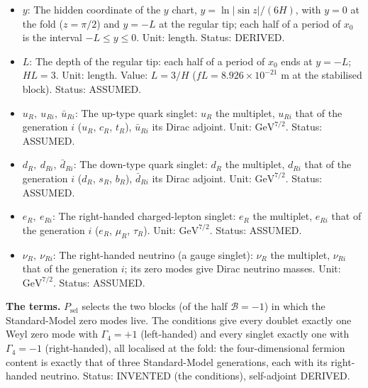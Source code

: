 \documentclass[
  10pt,
]{article}
\begin{document}
\begin{itemize}
  \(\psi \in \{Q, u_R, d_R, \ell, e_R, \nu_R\}\) of the generation
  \(i\), \(\psi_f\) one fermion component \(f\) (in four-dimensional
  formulas its zero mode); \(\bar\psi = \psi^\dagger C\) the Dirac
  adjoint. Unit: \(\mathrm{GeV}^{7/2}\) (eight dimensions),
  \(\mathrm{GeV}^{3/2}\) (four dimensions). Status: ASSUMED.
\item
  \(y\): The hidden coordinate of the \(y\) chart,
  \(y = \ln\lvert\sin z\rvert/(6H)\), with \(y = 0\) at the fold
  (\(z = \pi/2\)) and \(y = -L\) at the regular tip; each half of a
  period of \(x_0\) is the interval \(-L \le y \le 0\). Unit: length.
  Status: DERIVED.
\item
  \(L\): The depth of the regular tip: each half of a period of \(x_0\)
  ends at \(y = -L\); \(HL = 3\). Unit: length. Value: \(L = 3/H\)
  (\(fL = 8.926\times10^{-21}\) m at the stabilised block). Status:
  ASSUMED.
\item
  \(u_R,\ u_{Ri},\ \bar u_{Ri}\): The up-type quark singlet: \(u_R\) the
  multiplet, \(u_{Ri}\) that of the generation \(i\) (\(u_R\), \(c_R\),
  \(t_R\)), \(\bar u_{Ri}\) its Dirac adjoint. Unit:
  \(\mathrm{GeV}^{7/2}\). Status: ASSUMED.
\item
  \(d_R,\ d_{Ri},\ \bar d_{Ri}\): The down-type quark singlet: \(d_R\)
  the multiplet, \(d_{Ri}\) that of the generation \(i\) (\(d_R\),
  \(s_R\), \(b_R\)), \(\bar d_{Ri}\) its Dirac adjoint. Unit:
  \(\mathrm{GeV}^{7/2}\). Status: ASSUMED.
\item
  \(e_R,\ e_{Ri}\): The right-handed charged-lepton singlet: \(e_R\) the
  multiplet, \(e_{Ri}\) that of the generation \(i\) (\(e_R\),
  \(\mu_R\), \(\tau_R\)). Unit: \(\mathrm{GeV}^{7/2}\). Status: ASSUMED.
\item
  \(\nu_R,\ \nu_{Ri}\): The right-handed neutrino (a gauge singlet):
  \(\nu_R\) the multiplet, \(\nu_{Ri}\) that of the generation \(i\);
  its zero modes give Dirac neutrino masses. Unit:
  \(\mathrm{GeV}^{7/2}\). Status: ASSUMED.
\end{itemize}

\textbf{The terms.} \(P_{\mathrm{sel}}\) selects the two blocks (of the
half \(\mathcal{B} = -1\)) in which the Standard-Model zero modes live.
The conditions give every doublet exactly one Weyl zero mode with
\(\Gamma_4 = +1\) (left-handed) and every singlet exactly one with
\(\Gamma_4 = -1\) (right-handed), all localised at the fold: the
four-dimensional fermion content is exactly that of three Standard-Model
generations, each with its right-handed neutrino. Status: INVENTED (the
conditions), self-adjoint DERIVED.
\end{document}
